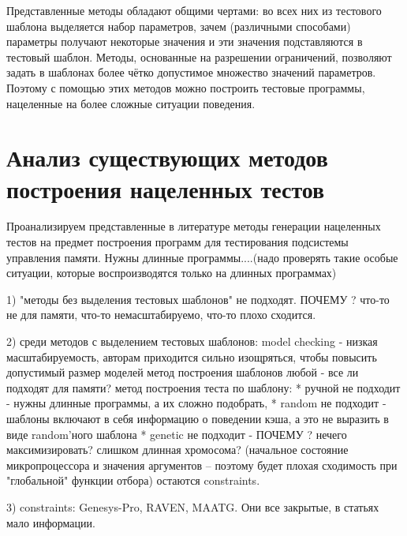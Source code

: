 \documentclass[14pt]{extreport}
\begin{document}
Представленные методы обладают общими чертами: во всех них из тестового шаблона выделяется набор параметров, зачем (различными способами) параметры получают некоторые значения и эти значения подставляются в тестовый шаблон. Методы, основанные на разрешении ограничений, позволяют задать в шаблонах более чётко допустимое множество значений параметров. Поэтому с помощью этих методов можно построить тестовые программы, нацеленные на более сложные ситуации поведения.

\section{Анализ существующих методов построения нацеленных тестов}

Проанализируем представленные в литературе методы генерации нацеленных тестов на предмет построения программ для тестирования подсистемы управления памяти. Нужны длинные программы....(надо проверять такие особые ситуации, которые воспроизводятся только на длинных программах)

1) "методы без выделения тестовых шаблонов" не подходят. ПОЧЕМУ ? что-то не для памяти, что-то немасштабируемо, что-то плохо сходится.

2) среди методов с выделением тестовых шаблонов:
		model checking - низкая масштабируемость, авторам приходится сильно изощряться, чтобы повысить допустимый размер моделей
		метод построения шаблонов любой - все ли подходят для памяти?
		метод построения теста по шаблону:
			* ручной не подходит - нужны длинные программы, а их сложно подобрать,
			* random не подходит - шаблоны включают в себя информацию о поведении кэша, а это не выразить в виде random'ного шаблона
			* genetic не подходит - ПОЧЕМУ ? нечего максимизировать? слишком длинная хромосома? (начальное состояние микропроцессора и значения аргументов -- поэтому будет плохая сходимость при "глобальной" функции отбора)
			остаются constraints.
		
3) constraints: Genesys-Pro, RAVEN, MAATG. Они все закрытые, в статьях мало информации.

\end{document}
